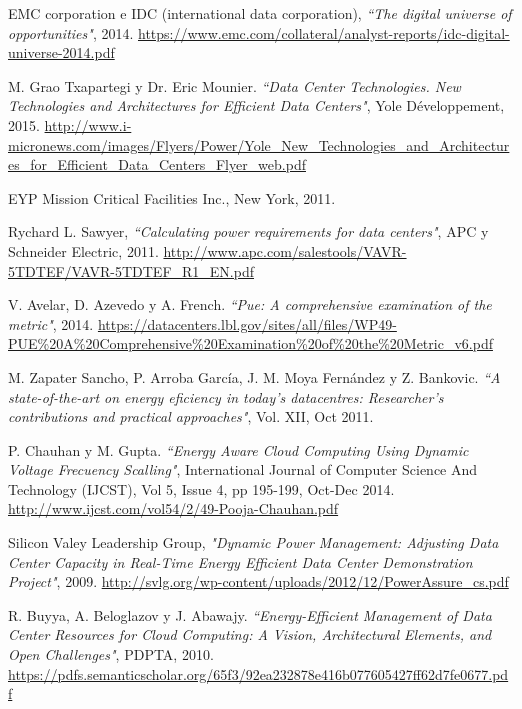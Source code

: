 \begin{thebibliography}{x}

	 EMC corporation e IDC (international data corporation),
	\textit{``The digital universe of opportunities"}, 2014. \url{https://www.emc.com/collateral/analyst-reports/idc-digital-universe-2014.pdf}

	 M. Grao Txapartegi y Dr. Eric Mounier. 
	\textit{``Data Center Technologies. New Technologies and Architectures for Efficient Data Centers"}, Yole Développement, 2015. \url{http://www.i-micronews.com/images/Flyers/Power/Yole_New_Technologies_and_Architectures_for_Efficient_Data_Centers_Flyer_web.pdf}

	 EYP Mission Critical Facilities Inc., New York, 2011.

	 Rychard L. Sawyer, 
	\textit{``Calculating power requirements for data centers"}, APC y Schneider Electric, 2011. \url{http://www.apc.com/salestools/VAVR-5TDTEF/VAVR-5TDTEF_R1_EN.pdf}

	 V. Avelar, D. Azevedo y A. French.
		\textit{``Pue: A comprehensive examination of the metric"}, 2014. \url{ https://datacenters.lbl.gov/sites/all/files/WP49-PUE\%20A\%20Comprehensive\%20Examination\%20of\%20the\%20Metric_v6.pdf}

	 M. Zapater Sancho, P. Arroba García, J. M. Moya Fernández y Z. Bankovic. 
		\textit{``A state-of-the-art on energy eficiency in today's datacentres: Researcher's contributions and practical approaches"}, Vol. XII, Oct 2011. 

	 P. Chauhan y M. Gupta.
		\textit{``Energy Aware Cloud Computing Using Dynamic Voltage Frecuency Scalling"}, International Journal of Computer Science And Technology (IJCST), Vol 5, Issue 4, pp 195-199, Oct-Dec 2014. \url{ http://www.ijcst.com/vol54/2/49-Pooja-Chauhan.pdf}

	 Silicon Valey Leadership Group,
		\textit{"Dynamic Power Management: Adjusting Data Center Capacity in Real-Time Energy Efficient Data Center Demonstration Project"}, 2009. \url{ http://svlg.org/wp-content/uploads/2012/12/PowerAssure_cs.pdf}

	 R. Buyya, A. Beloglazov y J. Abawajy. 
		\textit{``Energy-Efficient Management of Data Center Resources for Cloud Computing: A Vision, Architectural Elements, and Open Challenges"}, PDPTA, 2010. \url{https://pdfs.semanticscholar.org/65f3/92ea232878e416b077605427ff62d7fe0677.pdf}


\end{thebibliography}
